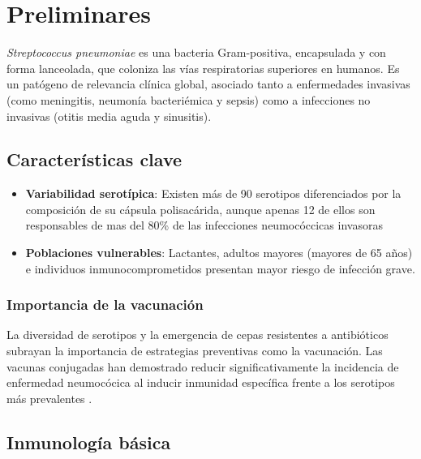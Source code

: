 \chapter{Preliminares}\label{chapter:preliminares}


\textit{Streptococcus pneumoniae} es una bacteria Gram-positiva, encapsulada y con forma lanceolada, que coloniza las vías respiratorias superiores en humanos. Es un patógeno de relevancia clínica global, asociado tanto a enfermedades invasivas (como meningitis, neumonía bacteriémica y sepsis) como a infecciones no invasivas (otitis media aguda y sinusitis).



\section{Características clave}
\begin{itemize}
    \item \textbf{Variabilidad serotípica}: Existen más de 90 serotipos diferenciados por la composición de su cápsula polisacárida, aunque apenas 12 de ellos son responsables de mas del 80\% de las infecciones neumocóccicas invasoras \cite{PREADOJ2001}
    \item \textbf{Poblaciones vulnerables}: Lactantes, adultos mayores (mayores de 65 años) e individuos inmunocomprometidos presentan mayor riesgo de infección grave.
\end{itemize}

\subsection{Importancia de la vacunación}
La diversidad de serotipos y la emergencia de cepas resistentes a antibióticos subrayan la importancia de estrategias preventivas como la vacunación. Las vacunas conjugadas han demostrado reducir significativamente la incidencia de enfermedad neumocócica al inducir inmunidad específica frente a los serotipos más prevalentes \cite{Snedecor2020a,Snedecor2020b}.

\section{Inmunología básica}

